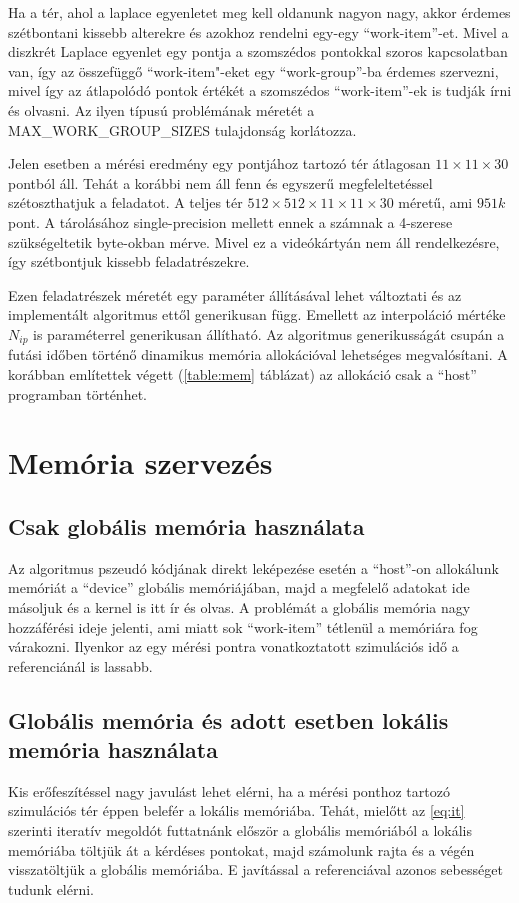 	Ha a tér, ahol a laplace egyenletet meg kell oldanunk nagyon nagy, akkor
	érdemes szétbontani kissebb alterekre és azokhoz rendelni egy-egy
	``work-item''-et. Mivel a diszkrét Laplace egyenlet egy pontja a szomszédos
	pontokkal szoros kapcsolatban van, így az összefüggő ``work-item"-eket egy
	``work-group''-ba érdemes szervezni, mivel így az átlapolódó pontok értékét a
	szomszédos ``work-item''-ek is tudják írni és olvasni. Az ilyen típusú
	problémának méretét a MAX\_WORK\_GROUP\_SIZES tulajdonság korlátozza.
	
	Jelen esetben a mérési eredmény egy pontjához tartozó tér átlagosan
	$11\times11\times30$ pontból áll.
	Tehát a korábbi nem áll fenn és egyszerű megfeleltetéssel szétoszthatjuk a
	feladatot.
	A teljes tér $512\times512\times11\times11\times30$ méretű, ami $951k$ pont.
	A tárolásához single-precision mellett ennek a számnak a 4-szerese
	szükségeltetik byte-okban mérve. Mivel ez a videókártyán nem áll
	rendelkezésre, így szétbontjuk kissebb feladatrészekre.
	
	Ezen feladatrészek méretét egy paraméter állításával lehet változtati és az
	implementált algoritmus ettől generikusan függ.
	Emellett az interpoláció mértéke $N_{ip}$ is paraméterrel generikusan állítható.
	Az algoritmus generikusságát csupán a futási időben történő dinamikus memória
	allokációval lehetséges megvalósítani. A korábban említettek végett (\ref{table:mem} táblázat)
	az allokáció csak a ``host'' programban történhet.

\section{Memória szervezés}
\subsection{Csak globális memória használata}
	Az algoritmus pszeudó kódjának direkt leképezése esetén a ``host''-on
	allokálunk memóriát a ``device'' globális memóriájában,
	majd a megfelelő adatokat ide másoljuk és a kernel is itt ír és olvas.
	A problémát a globális memória nagy hozzáférési ideje jelenti, ami miatt sok
	``work-item'' tétlenül a memóriára fog várakozni.
	Ilyenkor az egy mérési pontra vonatkoztatott szimulációs idő a
	referenciánál is lassabb.
\subsection{Globális memória és adott esetben lokális memória használata}
	Kis erőfeszítéssel nagy javulást lehet elérni, ha a mérési ponthoz tartozó
	szimulációs tér éppen belefér a lokális memóriába.
	Tehát, mielőtt az \eqref{eq:it} szerinti iteratív megoldót futtatnánk először a
	globális memóriából a lokális memóriába töltjük át a kérdéses pontokat, majd
	számolunk rajta és a végén visszatöltjük a globális memóriába.
	E javítással a referenciával azonos sebességet tudunk elérni.
